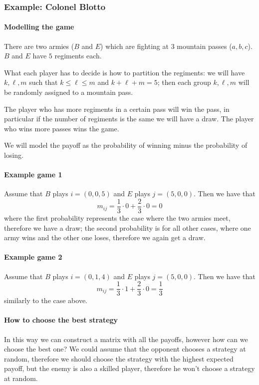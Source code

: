 \documentclass[12pt]{extarticle}
\begin{document}
\subsubsection{Example: Colonel Blotto}

\paragraph{Modelling the game}
There are two armies ($B$ and $E$) which are fighting at $3$ mountain passes ($a, b, c$).
$B$ and $E$ have $5$ regiments each.

What each player has to decide is how to partition the regiments:
we will have $k, \ell, m$ such that $k \leq \ell \leq m$ and $k+\ell + m = 5$;
then each group $k, \ell, m$ will be randomly assigned to a mountain pass.

The player who has more regiments in a certain pass will win the pass,
in particular if the number of regiments is the same we will have a draw.
The player who wins more passes wins the game.

We will model the payoff as the probability of winning minus the probability of losing.

\paragraph{Example game 1}
Assume that $B$ plays $i = (0,0,5)$ and $E$ plays $j = (5, 0, 0)$.
Then we have that
\begin{equation}
	m_{ij} = \frac{1}{3} \cdot 0 + \frac{2}{3} \cdot 0 = 0
\end{equation}
where the first probability represents the case where the two armies meet, therefore we have a draw;
the second probability is for all other cases, where one army wins and the other one loses,
therefore we again get a draw.

\paragraph{Example game 2}
Assume that $B$ plays $i = (0,1,4)$ and $E$ plays $j = (5, 0, 0)$.
Then we have that
\begin{equation}
	m_{ij} = \frac{1}{3} \cdot 1 + \frac{2}{3} \cdot 0 = \frac{1}{3}
\end{equation}
similarly to the case above.

\paragraph{How to choose the best strategy}
In this way we can construct a matrix with all the payoffs, however how can we choose the best one?
We could assume that the opponent chooses a strategy at random, therefore we should choose the
strategy with the highest expected payoff, but the enemy is also a skilled player, therefore he
won't choose a strategy at random.
\end{document}

